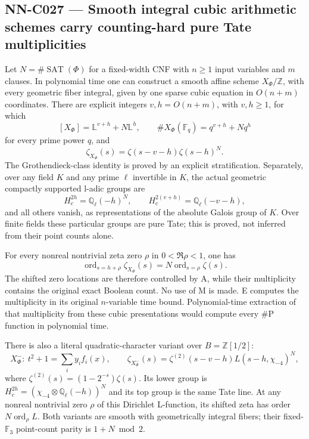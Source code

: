 \subsection{NN-C027 --- Smooth integral cubic arithmetic schemes carry counting-hard pure Tate multiplicities}
\begin{proposition}[NN-C027]
Let $N=\#\operatorname{SAT}(\Phi)$ for a fixed-width CNF with $n\geq1$ input variables and $m$ clauses. In polynomial time one can construct a smooth affine scheme $X_\Phi/\mathbb Z$, with every geometric fiber integral, given by one sparse cubic equation in $O(n+m)$ coordinates. There are explicit integers $v,h=O(n+m)$, with $v,h\geq1$, for which
\[
 [X_\Phi]=\mathbb L^{v+h}+N\mathbb L^h,
 \qquad
 \#X_\Phi(\mathbb F_q)=q^{v+h}+Nq^h
\]
for every prime power $q$, and
\[
         \zeta_{X_\Phi}(s)=\zeta(s-v-h)\zeta(s-h)^N.
\]
The Grothendieck-class identity is proved by an explicit stratification. Separately, over any field $K$ and any prime $\ell$ invertible in $K$, the actual geometric compactly supported l-adic groups are
\[
 H_c^{2h}=\mathbb Q_\ell(-h)^N,
 \qquad H_c^{2(v+h)}=\mathbb Q_\ell(-v-h),
\]
and all others vanish, as representations of the absolute Galois group of $K$. Over finite fields these particular groups are pure Tate; this is proved, not inferred from their point counts alone.

For every nonreal nontrivial zeta zero $\rho$ in $0<\Re\rho<1$, one has
\[
 \operatorname{ord}_{s=h+\rho}\zeta_{X_\Phi}(s)
              =N\operatorname{ord}_{s=\rho}\zeta(s).
\]
The shifted zero locations are therefore controlled by A, while their multiplicity contains the original exact Boolean count. No use of M is made. E computes the multiplicity in its original $n$-variable time bound. Polynomial-time extraction of that multiplicity from these cubic presentations would compute every $\#\mathrm P$ function in polynomial time.

There is also a literal quadratic-character variant over $B=\mathbb Z[1/2]$:
\[
 X^-_\Phi:\ t^2+1=\sum_i y_i f_i(x),\qquad
 \zeta_{X^-_\Phi}(s)=\zeta^{(2)}(s-v-h)L(s-h,\chi_{-4})^N,
\]
where $\zeta^{(2)}(s)=(1-2^{-s})\zeta(s)$. Its lower group is
$H_c^{2h}=(\chi_{-4}\otimes\mathbb Q_\ell(-h))^N$ and its top group is the same Tate line. At any nonreal nontrivial zero $\rho$ of this Dirichlet L-function, its shifted zeta has order $N\operatorname{ord}_\rho L$. Both variants are smooth with geometrically integral fibers; their fixed-$\mathbb F_3$ point-count parity is $1+N\bmod2$.
\end{proposition}
